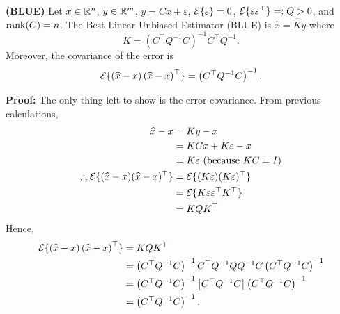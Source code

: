 \begin{thm} \textbf{(BLUE)}
     Let $x\in\mathbb R^n$, $y\in\mathbb R^m$, $y=Cx+\varepsilon$, $\mathcal{E}\{\varepsilon\}=0$, $\mathcal{E}\{\varepsilon\varepsilon^\top\}=:Q>0$, and $\mathrm{rank}(C)=n$. The Best Linear Unbiased Estimator (BLUE) is $\widehat{x}=\widehat{K}y$ where
    \begin{equation*}
        \widehat{K}=\left(C^\top Q^{-1}C\right)^{-1}C^\top Q^{-1}.
    \end{equation*}
    Moreover, the covariance of the error is
    \begin{equation*}
        \mathcal{E}\{\left(\widehat{x}-x\right)\left(\widehat{x}-x\right)^\top\}=\left(C^\top Q^{-1}C\right)^{-1}.
    \end{equation*}

\end{thm}

\textbf{Proof:} The only thing left to show is the error covariance. From previous calculations,
    \begin{align*}
        \widehat{x}-x&=Ky-x\\
        &=KCx+K\varepsilon-x\\
        &=K\varepsilon~(\text{because}~KC=I)\\
        \therefore \mathcal{E}\{(\widehat{x}-x)(\widehat{x}-x)^\top\}&=\mathcal{E}\{(K\varepsilon)(K\varepsilon)^\top\}\\
        &=\mathcal{E}\{K\varepsilon\varepsilon^\top K^\top\}\\
        &=KQK^\top
    \end{align*}
    Hence, 
    \begin{align*}
        \mathcal{E}\{\left(\widehat{x}-x\right)\left(\widehat{x}-x\right)^\top\}&=KQK^\top\\
        &=\left(C^\top Q^{-1}C\right)^{-1}C^\top Q^{-1}QQ^{-1}C\left(C^\top Q^{-1}C\right)^{-1}\\
        &=\left(C^\top Q^{-1}C\right)^{-1}\left[C^\top Q^{-1}C\right]\left(C^\top Q^{-1}C\right)^{-1}\\
        &=\left(C^\top Q^{-1}C\right)^{-1}.
    \end{align*}
    
    \Qed
    
